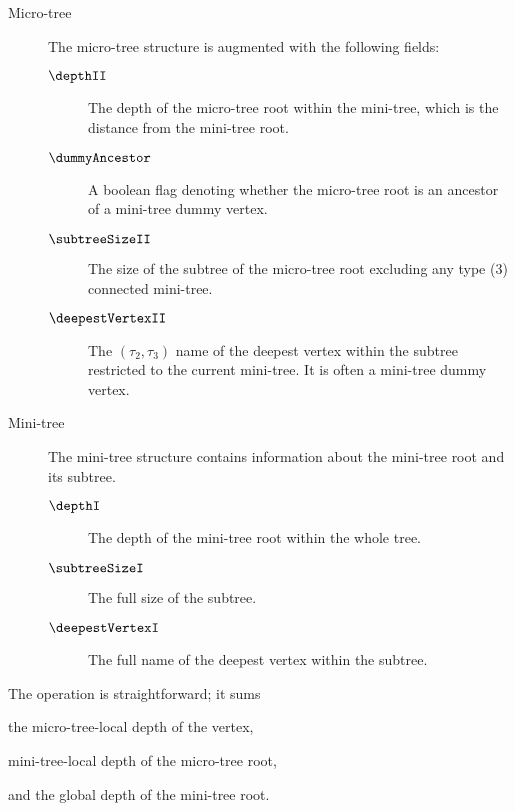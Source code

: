 \begin{description}
	\item[Micro-tree]
	The micro-tree structure is augmented with the following fields:
	\begin{description}
		\item[$\depthII$]
		The depth of the micro-tree root within the mini-tree, which is the distance from the mini-tree root.
		
		\item[$\dummyAncestor$]
		A boolean flag denoting whether the micro-tree root is an ancestor of a mini-tree dummy vertex.
		
		\item[$\subtreeSizeII$]
		The size of the subtree of the micro-tree root excluding any type (3) connected mini-tree.
		
		\item[$\deepestVertexII$]
		The $(\tau_2, \tau_3)$ name of the deepest vertex within the subtree restricted to the current mini-tree.
		It is often a mini-tree dummy vertex.
	\end{description}
	
	\item[Mini-tree]
	The mini-tree structure contains information about the mini-tree root and its subtree.
	\begin{description}
		\item[$\depthI$] 
		The depth of the mini-tree root within the whole tree.
		
		\item[$\subtreeSizeI$]
		The full size of the subtree.
		
		\item[$\deepestVertexI$]
		The full name of the deepest vertex within the subtree.
	\end{description}
\end{description}

The operation \dep{} is straightforward; it sums
\begin{iteminline}
	\item the micro-tree-local depth of the vertex,
	\item mini-tree-local depth of the micro-tree root,
	\item and the global depth of the mini-tree root.
\end{iteminline}

\begin{algorithm}
\begin{algorithmic}
		\State {}
		\State {}
	\Else
		\State {}
	\EndIf
\EndFunction
\end{algorithmic}
\end{algorithm}

